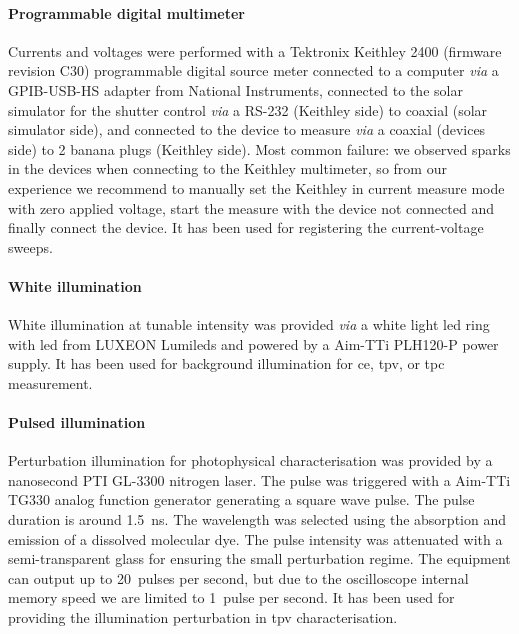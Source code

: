 		\paragraph{Programmable digital multimeter}
		Currents and voltages were performed with a Tektronix Keithley 2400 (firmware revision C30) programmable digital source meter connected to a computer \textsl{via} a GPIB-USB-HS adapter from National Instruments, connected to the solar simulator for the shutter control \textsl{via} a RS-232 (Keithley side) to coaxial (solar simulator side), and connected to the device to measure \textsl{via} a coaxial (devices side) to 2 banana plugs (Keithley side).
		Most common failure: we observed sparks in the devices when connecting to the Keithley multimeter, so from our experience we recommend to manually set the Keithley in current measure mode with zero applied voltage, start the measure with the device not connected and finally connect the device.
		It has been used for registering the current-voltage sweeps.

		\paragraph{White  illumination}
		White illumination at tunable intensity was provided \textsl{via} a white light \gls{led} ring with \gls{led} from LUXEON Lumileds and powered by a Aim-TTi PLH120-P power supply.
		It has been used for background illumination for \acrfull{ce}, \acrfull{tpv}, or \acrfull{tpc} measurement.

		\paragraph{Pulsed illumination}
		Perturbation illumination for photophysical characterisation was provided by a nanosecond PTI GL-3300 nitrogen laser.
		The pulse was triggered with a Aim-TTi TG330 analog function generator generating a square wave pulse.
		The pulse duration is around \SI{1.5}{\ns}.
		The wavelength was selected using the absorption and emission of a dissolved molecular dye.
		The pulse intensity was attenuated with a semi-transparent glass for ensuring the small perturbation regime.
		The equipment can output up to 20~pulses per second, but due to the oscilloscope internal memory speed we are limited to 1~pulse per second.
		It has been used for providing the illumination perturbation in \acrshort{tpv} characterisation.

